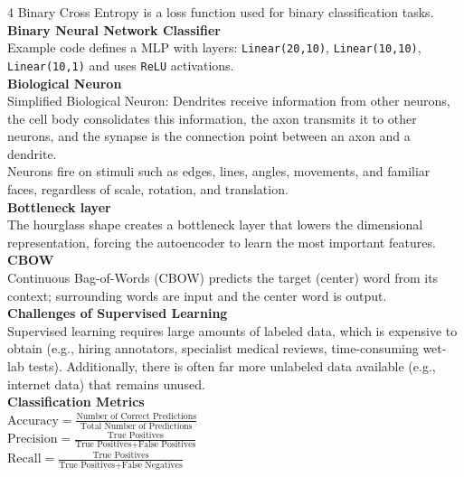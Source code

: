 \documentclass[8pt]{extarticle}
\begin{document}
\begin{multicols}{4}
Binary Cross Entropy is a loss function used for binary classification tasks.\\
\vspace{2pt}\textbf{Binary Neural Network Classifier}\\
Example code defines a MLP with layers: \texttt{Linear(20,10)}, \texttt{Linear(10,10)}, \texttt{Linear(10,1)} and uses \texttt{ReLU} activations.\\
\vspace{2pt}\textbf{Biological Neuron}\\
Simplified Biological Neuron: Dendrites receive information from other neurons, the cell body consolidates this information, the axon transmits it to other neurons, and the synapse is the connection point between an axon and a dendrite.\\
Neurons fire on stimuli such as edges, lines, angles, movements, and familiar faces, regardless of scale, rotation, and translation.\\
\vspace{2pt}\textbf{Bottleneck layer}\\
The hourglass shape creates a bottleneck layer that lowers the dimensional representation, forcing the autoencoder to learn the most important features.\\
\vspace{2pt}\textbf{CBOW}\\
Continuous Bag-of-Words (CBOW) predicts the target (center) word from its context; surrounding words are input and the center word is output.\\
\vspace{2pt}\textbf{Challenges of Supervised Learning}\\
Supervised learning requires large amounts of labeled data, which is expensive to obtain (e.g., hiring annotators, specialist medical reviews, time-consuming wet-lab tests). Additionally, there is often far more unlabeled data available (e.g., internet data) that remains unused.\\
\vspace{2pt}\textbf{Classification Metrics}\\
$ \text{Accuracy} = \frac{\text{Number of Correct Predictions}}{\text{Total Number of Predictions}} $\\
$ \text{Precision} = \frac{\text{True Positives}}{\text{True Positives} + \text{False Positives}} $\\
$ \text{Recall} = \frac{\text{True Positives}}{\text{True Positives} + \text{False Negatives}} $\\


\end{multicols}
\end{document}
